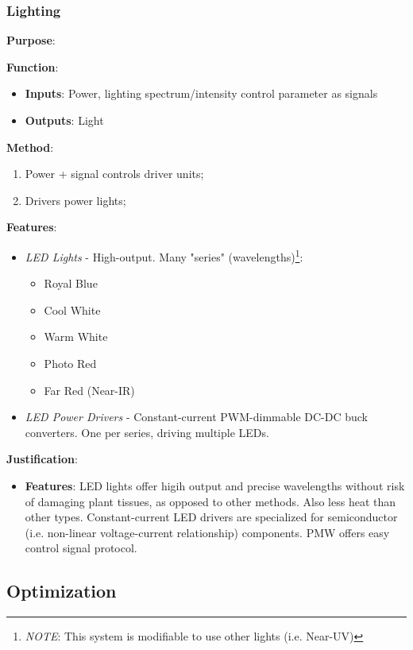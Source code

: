 \documentclass{report}
\begin{document}
\subsubsection{Lighting}
\label{sec:lighting}

\textbf{Purpose}:

\textbf{Function}:
\begin{itemize}
    \item \textbf{Inputs}: Power, lighting spectrum/intensity control parameter as signals
    \item \textbf{Outputs}: Light
\end{itemize}

\textbf{Method}:
\begin{enumerate}
    \item Power + signal controls driver units;
    \item Drivers power lights;
\end{enumerate}

\textbf{Features}:
\begin{itemize}
    \item \textit{LED Lights} - High-output. Many "series" (wavelengths)\footnote{\textit{NOTE}: This system is modifiable to use other lights (i.e. Near-UV)}:
    \begin{itemize}
        \item Royal Blue
        \item Cool White
        \item Warm White
        \item Photo Red
        \item Far Red (Near-IR)
    \end{itemize}
    \item \textit{LED Power Drivers} - Constant-current PWM-dimmable DC-DC buck converters. One per series, driving multiple LEDs.
\end{itemize}

\textbf{Justification}:
\begin{itemize}
    \item \textbf{Features}: LED lights offer higih output and precise wavelengths without risk of damaging plant tissues, as opposed to other methods. Also less heat than other types. Constant-current LED drivers are specialized for semiconductor (i.e. non-linear voltage-current relationship) components. PMW offers easy control signal protocol.
\end{itemize}

\subsection{Optimization}
\label{sec:optimization}
\end{document}
